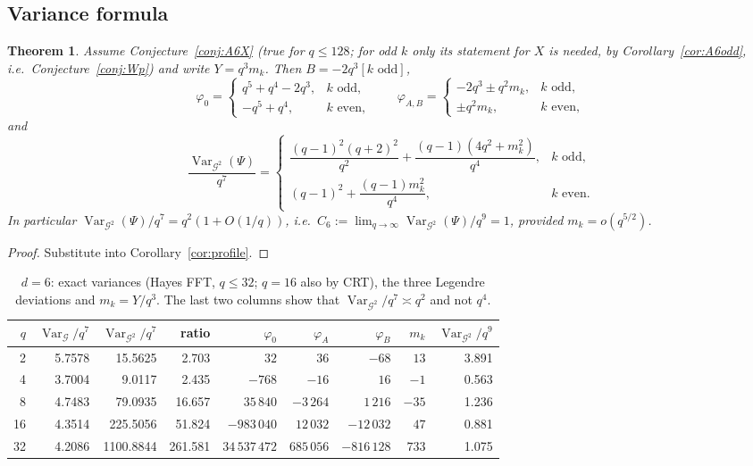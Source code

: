 \documentclass[11pt,a4paper]{amsart}
\newtheorem{theorem}{Theorem}[section]
\theoremstyle{definition}
\newcommand{\G}{\mathcal{G}}
\newcommand{\Var}{\operatorname{Var}}
\begin{document}
\subsection{Variance formula}
\begin{theorem}\label{thm:varH6}
Assume Conjecture~\ref{conj:A6X} (true for $q\le128$; for odd $k$ only its statement for $X$ is needed, by Corollary~\ref{cor:A6odd}, i.e.\ Conjecture~\ref{conj:Wp}) and write $Y=q^3m_k$. Then $B=-2q^3[k\text{ odd}]$,
\[
\varphi_0=\begin{cases}q^5+q^4-2q^3,&k\text{ odd},\\-q^5+q^4,&k\text{ even},\end{cases}\qquad
\varphi_{A,B}=\begin{cases}-2q^3\pm q^2m_k,&k\text{ odd},\\ \pm q^2m_k,&k\text{ even},\end{cases}
\]
and
\[
\frac{\Var_{\G^2}(\Psi)}{q^7}=\begin{cases}\dfrac{(q-1)^2(q+2)^2}{q^2}+\dfrac{(q-1)(4q^2+m_k^2)}{q^4},&k\text{ odd},\\[2ex](q-1)^2+\dfrac{(q-1)m_k^2}{q^4},&k\text{ even}.\end{cases}
\]
In particular $\Var_{\G^2}(\Psi)/q^7=q^2(1+O(1/q))$, i.e.\ $C_6:=\lim_{q\to\infty}\Var_{\G^2}(\Psi)/q^9=1$, provided $m_k=o(q^{5/2})$.
\end{theorem}
\begin{proof}
Substitute into Corollary~\ref{cor:profile}.
\end{proof}

\begin{table}[ht]
\centering
\caption{$d=6$: exact variances (Hayes FFT, $q\le32$; $q=16$ also by CRT), the three Legendre deviations and $m_k=Y/q^3$. The last two columns show that $\Var_{\G^2}/q^7\asymp q^2$ and not $q^4$.}\label{tab:d6var}
\begin{tabular}{@{}rrrrrrrrr@{}}
\toprule
$q$ & $\Var_\G/q^7$ & $\Var_{\G^2}/q^7$ & ratio & $\varphi_0$ & $\varphi_A$ & $\varphi_B$ & $m_k$ & $\Var_{\G^2}/q^9$\\
\midrule
2 & 5.7578 & 15.5625 & 2.703 & $32$ & $36$ & $-68$ & $13$ & 3.891\\
4 & 3.7004 & 9.0117 & 2.435 & $-768$ & $-16$ & $16$ & $-1$ & 0.563\\
8 & 4.7483 & 79.0935 & 16.657 & $35\,840$ & $-3\,264$ & $1\,216$ & $-35$ & 1.236\\
16 & 4.3514 & 225.5056 & 51.824 & $-983\,040$ & $12\,032$ & $-12\,032$ & $47$ & 0.881\\
32 & 4.2086 & 1100.8844 & 261.581 & $34\,537\,472$ & $685\,056$ & $-816\,128$ & $733$ & 1.075\\
\bottomrule
\end{tabular}
\end{table}
\end{document}
